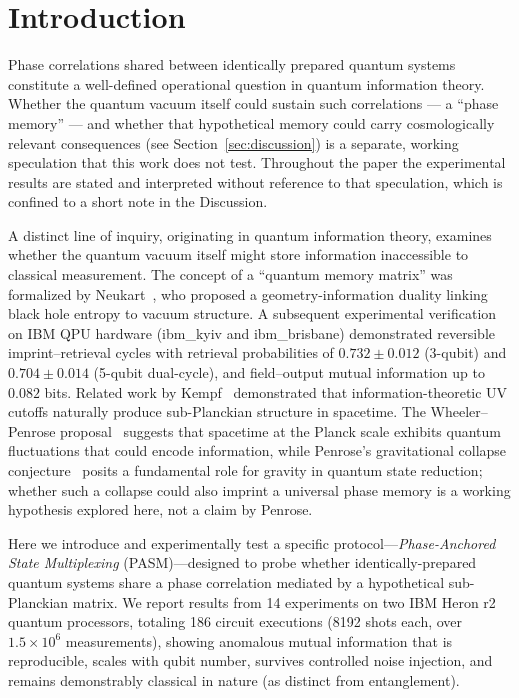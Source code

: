\documentclass[12pt,a4paper]{article}
\begin{document}
\section{Introduction}
\label{sec:intro}

Phase correlations shared between identically prepared quantum systems constitute a well-defined operational question in quantum information theory. Whether the quantum vacuum itself could sustain such correlations --- a ``phase memory'' --- and whether that hypothetical memory could carry cosmologically relevant consequences (see Section~\ref{sec:discussion}) is a separate, working speculation that this work does not test. Throughout the paper the experimental results are stated and interpreted without reference to that speculation, which is confined to a short note in the Discussion.

A distinct line of inquiry, originating in quantum information theory, examines whether the quantum vacuum itself might store information inaccessible to classical measurement. The concept of a ``quantum memory matrix'' was formalized by Neukart~\cite{neukart2025}, who proposed a geometry-information duality linking black hole entropy to vacuum structure. A subsequent experimental verification~\cite{neukart2026qip} on IBM QPU hardware (ibm\_kyiv and ibm\_brisbane) demonstrated reversible imprint--retrieval cycles with retrieval probabilities of $0.732 \pm 0.012$ (3-qubit) and $0.704 \pm 0.014$ (5-qubit dual-cycle), and field--output mutual information up to $0.082$ bits. Related work by Kempf~\cite{kempf2009} demonstrated that information-theoretic UV cutoffs naturally produce sub-Planckian structure in spacetime. The Wheeler--Penrose proposal~\cite{wheeler1957,penrose1996} suggests that spacetime at the Planck scale exhibits quantum fluctuations that could encode information, while Penrose's gravitational collapse conjecture~\cite{penrose1996} posits a fundamental role for gravity in quantum state reduction; whether such a collapse could also imprint a universal phase memory is a working hypothesis explored here, not a claim by Penrose.

Here we introduce and experimentally test a specific protocol---\textit{Phase-Anchored State Multiplexing} (PASM)---designed to probe whether identically-prepared quantum systems share a phase correlation mediated by a hypothetical sub-Planckian matrix. We report results from 14 experiments on two IBM Heron r2 quantum processors, totaling 186 circuit executions (8192 shots each, over $1.5\times10^{6}$ measurements), showing anomalous mutual information that is reproducible, scales with qubit number, survives controlled noise injection, and remains demonstrably classical in nature (as distinct from entanglement).
\end{document}
